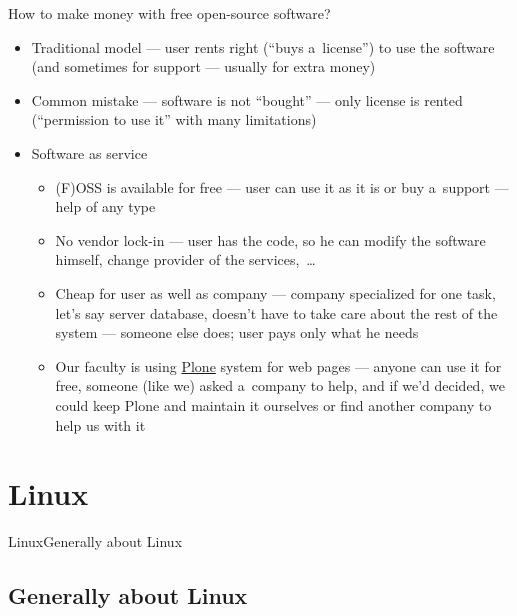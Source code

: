 \documentclass[compress, xelatex, 11pt, xcolor=svgnames, aspectratio=169,
	hyperref={
		bookmarks=true,
		unicode=true,
		colorlinks=true,
		pdftitle={Linux, command line and MetaCentrum},
		plainpages=false,
		pdfauthor={Vojtech Zeisek},
		pdfsubject={Course about use of Linux command line, writing shell scripts and using MetaCentrum of CESNET},
		pdfcreator={XeLaTeX},
		pdfkeywords={Linux, GNU, BASH, shell, command line, MetaCentrum},
		linkcolor=DarkRed, %
		anchorcolor=DarkBlue, %
		citecolor=Indigo, %
		filecolor=NavyBlue, %
		menucolor=DarkMagenta, %
		urlcolor=DarkBlue, %
		},
	url={hyphens, lowtilde} %
	]{beamer}
\begin{document}
\begin{frame}{How to make money with free open-source software?}
	\begin{itemize}
		\item Traditional model --- user rents right (\enquote{buys a~license}) to use the software (and sometimes for support --- usually for extra money)
		\item Common mistake --- software is not \enquote{bought} --- only license is rented (\enquote{permission to use it} with many limitations)
		\item Software as service
		\begin{itemize}
			\item (F)OSS is available for free --- user can use it as it is or buy a~support --- help of any type
			\item No vendor lock-in --- user has the code, so he can modify the software himself, change provider of the services,~\ldots
			\item Cheap for user as well as company --- company specialized for one task, let's say server database, doesn't have to take care about the rest of the system --- someone else does; user pays only what he needs
			\item Our faculty is using \href{https://plone.org/}{Plone} system for web pages --- anyone can use it for free, someone (like we) asked a~company to help, and if we'd decided, we  could keep Plone and maintain it ourselves or find another company to help us with it
		\end{itemize}
	\end{itemize}
\end{frame}

\section{Linux}

\begin{frame}{Linux}{Generally about Linux}
	\tableofcontents[currentsection, sectionstyle=show/hide, hideothersubsections]
\end{frame}

\subsection{Generally about Linux}
\end{document}
